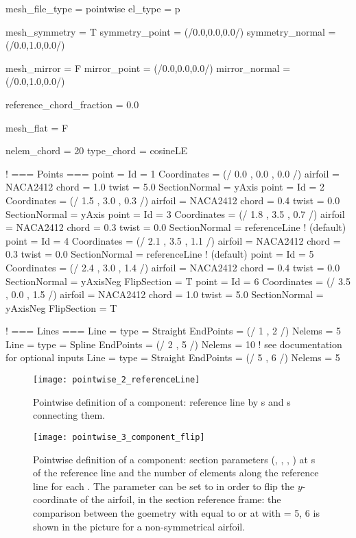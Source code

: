 \begin{inputfile}[frame=single, caption={''Pointwise'' geometry definition }, label={file:pointwise_example_file.in}]
mesh_file_type = pointwise
el_type = p

mesh_symmetry = T
symmetry_point = (/0.0,0.0,0.0/)
symmetry_normal = (/0.0,1.0,0.0/)

mesh_mirror = F
mirror_point = (/0.0,0.0,0.0/)
mirror_normal = (/0.0,1.0,0.0/)

reference_chord_fraction = 0.0

mesh_flat = F

nelem_chord = 20
type_chord = cosineLE

! === Points ===
point = {
  Id = 1
  Coordinates = (/ 0.0 , 0.0 , 0.0 /)
  airfoil = NACA2412
  chord = 1.0
  twist = 5.0
  SectionNormal = yAxis
}
point = {
  Id = 2
  Coordinates = (/ 1.5 , 3.0 , 0.3 /)
  airfoil = NACA2412
  chord = 0.4
  twist = 0.0
  SectionNormal = yAxis
}
point = {
  Id = 3
  Coordinates = (/ 1.8 , 3.5 , 0.7 /)
  airfoil = NACA2412
  chord = 0.3
  twist = 0.0
  SectionNormal = referenceLine ! (default)
}
point = {
  Id = 4
  Coordinates = (/ 2.1 , 3.5 , 1.1 /)
  airfoil = NACA2412
  chord = 0.3
  twist = 0.0
  SectionNormal = referenceLine ! (default)
}
point = {
  Id = 5
  Coordinates = (/ 2.4 , 3.0 , 1.4 /)
  airfoil = NACA2412
  chord = 0.4
  twist = 0.0
  SectionNormal = yAxisNeg
  FlipSection = T
}
point = {
  Id = 6
  Coordinates = (/ 3.5 , 0.0 , 1.5 /)
  airfoil = NACA2412
  chord = 1.0
  twist = 5.0
  SectionNormal = yAxisNeg
  FlipSection = T
}

! === Lines ===
Line = {
  type = Straight
  EndPoints = (/ 1 , 2 /)
  Nelems = 5
}
Line = {
  type = Spline
  EndPoints = (/ 2 , 5 /)
  Nelems = 10
  ! see documentation for optional inputs
}
Line = {
  type = Straight
  EndPoints = (/ 5 , 6 /)
  Nelems = 5
}

\end{inputfile}
%
\begin{figure}[h!]
\centering
\texttt{[image: pointwise\_2\_referenceLine]}
    \caption{Pointwise definition of a component: reference line by s and s connecting them.}
\label{fig:pointwise_reference_line}
\end{figure}
%
\begin{figure}[h!]
\centering
\texttt{[image: pointwise\_3\_component\_flip]}
    \caption{Pointwise definition of a component: section parameters (, , , ) at s of the reference line and the number  of elements along the reference line for each . The parameter  can be set to  in order to flip the $y$-coordinate of the airfoil, in the section reference frame: the comparison between the goemetry with  equal to  or   at  with  = 5, 6 is shown in the picture for a non-symmetrical airfoil.}
\label{fig:pointwise_component}
\end{figure}


